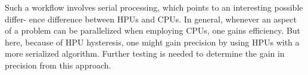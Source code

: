 \documentclass[12pt]{article}
\begin{document}
Such a workflow involves serial processing, which points to an interesting 
possible differ- ence difference between HPUs and CPUs. In general, whenever 
an aspect of a problem can be parallelized when employing CPUs, one gains 
efficiency. But here, because of HPU hysteresis, one might gain precision by 
using HPUs with a more serialized algorithm. Further testing is needed to 
determine the gain in precision from this approach.




\end{document}
